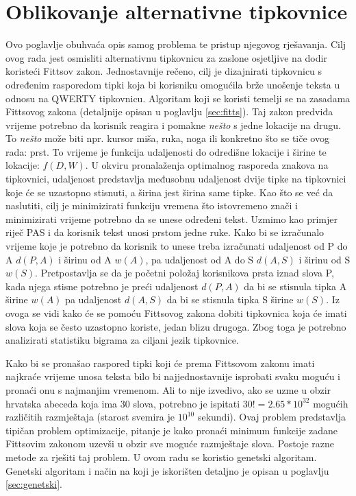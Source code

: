 \documentclass[times, utf8, zavrsni]{fer}
\begin{document}
\chapter{Oblikovanje alternativne tipkovnice}
Ovo poglavlje obuhvaća opis samog problema te pristup njegovog rješavanja. Cilj ovog rada jest osmisliti alternativnu tipkovnicu za zaslone osjetljive na dodir koristeći Fittsov zakon. Jednostavnije rečeno, cilj je dizajnirati tipkovnicu s određenim rasporedom tipki koja bi korisniku omogućila brže unošenje teksta u odnosu na QWERTY tipkovnicu. Algoritam koji se koristi temelji se na zasadama Fittsovog zakona (detaljnije opisan u poglavlju \ref{sec:fitts}). Taj zakon predviđa vrijeme potrebno da korisnik reagira i pomakne \emph{nešto} s jedne lokacije na drugu. To \emph{nešto} može biti npr. kursor miša, ruka, noga ili konkretno što se tiče ovog rada: prst. To vrijeme je funkcija udaljenosti do odredišne lokacije i širine te lokacije: $f(D,W)$. U okviru pronalaženja optimalnog rasporeda znakova na tipkovnici, udaljenost predstavlja međusobnu udaljenost dvije tipke na tipkovnici koje će se uzastopno stisnuti, a širina jest širina same tipke. Kao što se već da naslutiti, cilj je minimizirati funkciju vremena što istovremeno znači i minimizirati vrijeme potrebno da se unese određeni tekst. Uzmimo kao primjer riječ PAS i da korisnik tekst unosi prstom jedne ruke. Kako bi se izračunalo vrijeme koje je potrebno da korisnik to unese treba izračunati udaljenost od P do A $d(P,A)$ i širinu od A $w(A)$, pa udaljenost od A do S $d(A,S)$ i širinu od S $w(S)$. Pretpostavlja se da je početni položaj korisnikova prsta iznad slova P, kada njega stisne potrebno je preći udaljenost $d(P,A)$ da bi se stisnula tipka A širine $w(A)$ pa udaljenost $d(A,S)$ da bi se stisnula tipka S širine $w(S)$. Iz ovoga se vidi kako će se pomoću Fittsovog zakona dobiti tipkovnica koja će imati slova koja se često uzastopno koriste, jedan blizu drugoga. Zbog toga je potrebno analizirati statistiku bigrama za ciljani jezik tipkovnice.

Kako bi se pronašao raspored tipki koji će prema Fittsovom zakonu imati najkraće vrijeme unosa teksta bilo bi najjednostavnije isprobati svaku moguću i pronaći onu s najmanjim vremenom. Ali to nije izvedivo, ako se uzme u obzir hrvatska abeceda koja ima 30 slova, potrebno je ispitati $30! = 2.65*10^{32}$ mogućih različitih razmještaja (starost svemira je $10^{10}$ sekundi). Ovaj problem predstavlja tipičan problem optimizacije, pitanje je kako pronaći minimum funkcije zadane Fittsovim zakonom uzevši u obzir sve moguće razmještaje slova. Postoje razne metode za rješiti taj problem. U ovom radu se koristio genetski algoritam. Genetski algoritam i način na koji je iskorišten detaljno je opisan u poglavlju \ref{sec:genetski}.
\end{document}
